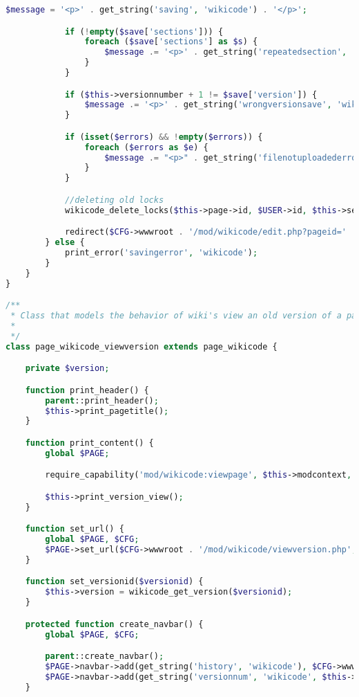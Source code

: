 \begin{lstlisting}[language=PHP]
            $message = '<p>' . get_string('saving', 'wikicode') . '</p>';

            if (!empty($save['sections'])) {
                foreach ($save['sections'] as $s) {
                    $message .= '<p>' . get_string('repeatedsection', 'wikicode', $s) . '</p>';
                }
            }

            if ($this->versionnumber + 1 != $save['version']) {
                $message .= '<p>' . get_string('wrongversionsave', 'wikicode') . '</p>';
            }

            if (isset($errors) && !empty($errors)) {
                foreach ($errors as $e) {
                    $message .= "<p>" . get_string('filenotuploadederror', 'wikicode', $e->get_filename()) . "</p>";
                }
            }

            //deleting old locks
            wikicode_delete_locks($this->page->id, $USER->id, $this->section);

            redirect($CFG->wwwroot . '/mod/wikicode/edit.php?pageid=' . $this->page->id);
        } else {
            print_error('savingerror', 'wikicode');
        }
    }
}

/**
 * Class that models the behavior of wiki's view an old version of a page
 *
 */
class page_wikicode_viewversion extends page_wikicode {

    private $version;

    function print_header() {
        parent::print_header();
        $this->print_pagetitle();
    }

    function print_content() {
        global $PAGE;

        require_capability('mod/wikicode:viewpage', $this->modcontext, NULL, true, 'noviewpagepermission', 'wikicode');

        $this->print_version_view();
    }

    function set_url() {
        global $PAGE, $CFG;
        $PAGE->set_url($CFG->wwwroot . '/mod/wikicode/viewversion.php', array('pageid' => $this->page->id, 'versionid' => $this->version->id));
    }

    function set_versionid($versionid) {
        $this->version = wikicode_get_version($versionid);
    }

    protected function create_navbar() {
        global $PAGE, $CFG;

        parent::create_navbar();
        $PAGE->navbar->add(get_string('history', 'wikicode'), $CFG->wwwroot . '/mod/wikicode/history.php?pageid' . $this->page->id);
        $PAGE->navbar->add(get_string('versionnum', 'wikicode', $this->version->version));
    }


\end{lstlisting}
